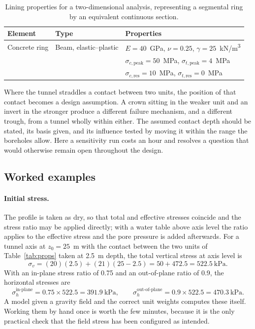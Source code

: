 \begin{table}[htbp]
\caption{Lining properties for a two-dimensional analysis, representing a
segmental ring by an equivalent continuous section.}
\label{tab:lining}
\centering
\small
\begin{tabular}{l l l}
\toprule
\textbf{Element} & \textbf{Type} & \textbf{Properties} \\
\midrule
Concrete ring & Beam, elastic--plastic & $E = 40$~GPa, $\nu = 0.25$, $\gamma = 25$~kN/m\textsuperscript{3} \\
 & & $\sigma_{c,\text{peak}} = 50$~MPa, $\sigma_{t,\text{peak}} = 4$~MPa \\
 & & $\sigma_{c,\text{res}} = 10$~MPa, $\sigma_{t,\text{res}} = 0$~MPa \\
\bottomrule
\end{tabular}
\end{table}

Where the tunnel straddles a contact between two units, the position of that
contact becomes a design assumption. A crown sitting in the
weaker unit and an invert in the stronger produce a different failure
mechanism, and a different trough, from a tunnel wholly within either. The
assumed contact depth should be stated, its basis given, and its influence
tested by moving it within the range the boreholes allow. Here
a sensitivity run costs an hour and resolves a question that would otherwise
remain open throughout the design.

\subsection{Worked examples}
\label{sec:worked-examples}

\paragraph{Initial stress.}
The profile is taken as dry, so that total and effective stresses coincide
and the stress ratio may be applied directly; with a water table above axis
level the ratio applies to the effective stress and the pore pressure is
added afterwards. For a tunnel axis at $z_0 = 25$~m with the contact between the two units of
Table~\ref{tab:props} taken at 2.5~m depth, the total vertical stress at axis
level is
\[
\sigma_v = (20)(2.5) + (21)(25 - 2.5) = 50 + 472.5 = 522.5\ \text{kPa} .
\]
With an in-plane stress ratio of 0.75 and an out-of-plane ratio of 0.9, the
horizontal stresses are
\[
\sigma_h^{\text{in-plane}} = 0.75 \times 522.5 = 391.9\ \text{kPa},
\qquad
\sigma_h^{\text{out-of-plane}} = 0.9 \times 522.5 = 470.3\ \text{kPa} .
\]
A model given a gravity field and the correct unit weights computes these
itself. Working them by hand once is worth the few minutes, because it is the
only practical check that the field stress has been configured as intended.

